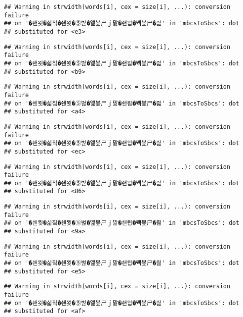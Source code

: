 \documentclass[]{article}
\begin{document}
\begin{verbatim}
## Warning in strwidth(words[i], cex = size[i], ...): conversion failure
## on '�쇈묏�싧칰�쇈묏�⑤벊�앮뵾尸ｊ맒�쇈묍�붹뵾尸�즲' in 'mbcsToSbcs': dot
## substituted for <e3>
\end{verbatim}

\begin{verbatim}
## Warning in strwidth(words[i], cex = size[i], ...): conversion failure
## on '�쇈묏�싧칰�쇈묏�⑤벊�앮뵾尸ｊ맒�쇈묍�붹뵾尸�즲' in 'mbcsToSbcs': dot
## substituted for <b9>
\end{verbatim}

\begin{verbatim}
## Warning in strwidth(words[i], cex = size[i], ...): conversion failure
## on '�쇈묏�싧칰�쇈묏�⑤벊�앮뵾尸ｊ맒�쇈묍�붹뵾尸�즲' in 'mbcsToSbcs': dot
## substituted for <a4>
\end{verbatim}

\begin{verbatim}
## Warning in strwidth(words[i], cex = size[i], ...): conversion failure
## on '�쇈묏�싧칰�쇈묏�⑤벊�앮뵾尸ｊ맒�쇈묍�붹뵾尸�즲' in 'mbcsToSbcs': dot
## substituted for <ec>
\end{verbatim}

\begin{verbatim}
## Warning in strwidth(words[i], cex = size[i], ...): conversion failure
## on '�쇈묏�싧칰�쇈묏�⑤벊�앮뵾尸ｊ맒�쇈묍�붹뵾尸�즲' in 'mbcsToSbcs': dot
## substituted for <86>
\end{verbatim}

\begin{verbatim}
## Warning in strwidth(words[i], cex = size[i], ...): conversion failure
## on '�쇈묏�싧칰�쇈묏�⑤벊�앮뵾尸ｊ맒�쇈묍�붹뵾尸�즲' in 'mbcsToSbcs': dot
## substituted for <9a>
\end{verbatim}

\begin{verbatim}
## Warning in strwidth(words[i], cex = size[i], ...): conversion failure
## on '�쇈묏�싧칰�쇈묏�⑤벊�앮뵾尸ｊ맒�쇈묍�붹뵾尸�즲' in 'mbcsToSbcs': dot
## substituted for <e5>
\end{verbatim}

\begin{verbatim}
## Warning in strwidth(words[i], cex = size[i], ...): conversion failure
## on '�쇈묏�싧칰�쇈묏�⑤벊�앮뵾尸ｊ맒�쇈묍�붹뵾尸�즲' in 'mbcsToSbcs': dot
## substituted for <af>
\end{verbatim}
\end{document}

